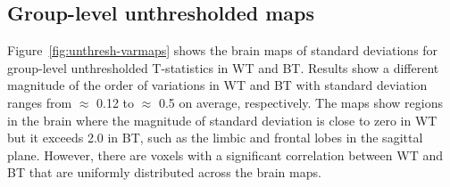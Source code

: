 \documentclass[conference]{IEEEtran}
\begin{document}
  \begin{figure}[b]
  \end{figure}



\subsection{Group-level unthresholded maps}

Figure~\ref{fig:unthresh-varmaps} shows the brain maps of standard deviations for group-level unthresholded T-statistics in WT and BT.
Results show a different magnitude of
the order of variations in WT and BT with standard deviation ranges from $\approx$ 0.12 to $\approx$ 0.5 on average, respectively.
The maps show regions in the brain where the magnitude of standard deviation is close to zero in WT but it exceeds 2.0 in BT,
such as the limbic and frontal lobes in the sagittal plane.
However, there are voxels with a significant correlation between WT and BT that are uniformly distributed across the brain maps.
\end{document}
